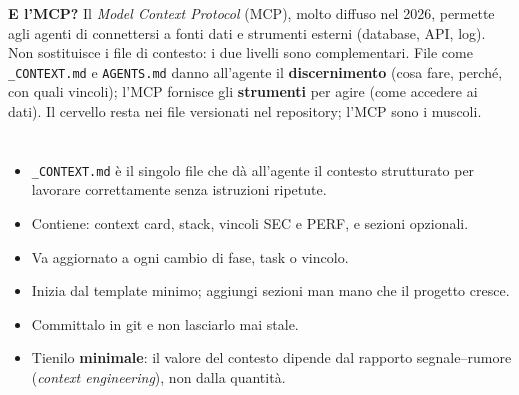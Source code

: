 \begin{notebox}
\textbf{E l'MCP?} Il \textit{Model Context Protocol} (MCP), molto diffuso nel 2026, permette agli agenti di connettersi a fonti dati e strumenti esterni (database, API, log). Non sostituisce i file di contesto: i due livelli sono complementari. File come \texttt{\_CONTEXT.md} e \texttt{AGENTS.md} danno all'agente il \textbf{discernimento} (cosa fare, perché, con quali vincoli); l'MCP fornisce gli \textbf{strumenti} per agire (come accedere ai dati). Il cervello resta nei file versionati nel repository; l'MCP sono i muscoli.
\end{notebox}

\section*{\LabelSummary}

\begin{itemize}
  \item \texttt{\_CONTEXT.md} è il singolo file che dà all'agente il contesto strutturato per lavorare correttamente senza istruzioni ripetute.
  \item Contiene: context card, stack, vincoli SEC e PERF, e sezioni opzionali.
  \item Va aggiornato a ogni cambio di fase, task o vincolo.
  \item Inizia dal template minimo; aggiungi sezioni man mano che il progetto cresce.
  \item Committalo in git e non lasciarlo mai stale.
  \item Tienilo \textbf{minimale}: il valore del contesto dipende dal rapporto segnale--rumore (\textit{context engineering}), non dalla quantità.
\end{itemize}
